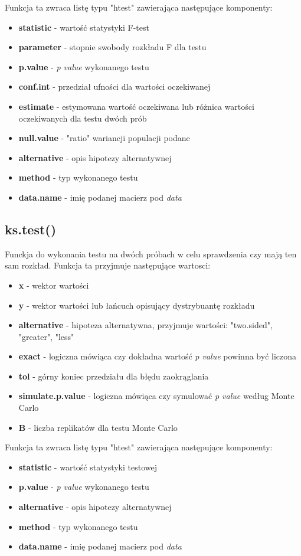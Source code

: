 \documentclass{article}
\begin{document}
Funkcja ta zwraca listę typu "htest" zawierająca następujące komponenty:
\begin{itemize}
\item \textbf{statistic} - wartość statystyki F-test
\item \textbf{parameter} - stopnie swobody rozkładu F dla testu
\item \textbf{p.value} - \textit{p value} wykonanego testu
\item \textbf{conf.int} - przedział ufności dla wartości oczekiwanej
\item \textbf{estimate} - estymowana wartość oczekiwana lub różnica wartości oczekiwanych dla testu dwóch prób
\item \textbf{null.value} - "ratio" wariancji populacji podane
\item \textbf{alternative} - opis hipotezy alternatywnej
\item \textbf{method} - typ wykonanego testu
\item \textbf{data.name} - imię podanej macierz pod \textit{data}
\end{itemize}

\subsection{ks.test()}
Funckja do wykonania testu na dwóch próbach w celu sprawdzenia czy mają ten sam rozkład. Funkcja ta przyjmuje następujące wartosci:
\begin{itemize}
\item \textbf{x} - wektor wartości
\item \textbf{y} - wektor wartości lub łańcuch opisujący dystrybuantę rozkładu
\item \textbf{alternative} - hipoteza alternatywna, przyjmuje wartości: "two.sided", "greater", "less"
\item \textbf{exact} - logiczna mówiąca czy dokładna wartość \textit{p value} powinna być liczona
\item \textbf{tol} - górny koniec przedziału dla błędu zaokrąglania
\item \textbf{simulate.p.value} - logiczna mówiąca czy symulować \textit{p value} według Monte Carlo
\item \textbf{B} - liczba replikatów dla testu Monte Carlo
\end{itemize}

Funkcja ta zwraca listę typu "htest" zawierająca następujące komponenty:
\begin{itemize}
\item \textbf{statistic} - wartość statystyki testowej
\item \textbf{p.value} - \textit{p value} wykonanego testu
\item \textbf{alternative} - opis hipotezy alternatywnej
\item \textbf{method} - typ wykonanego testu
\item \textbf{data.name} - imię podanej macierz pod \textit{data}
\end{itemize}
\end{document}

